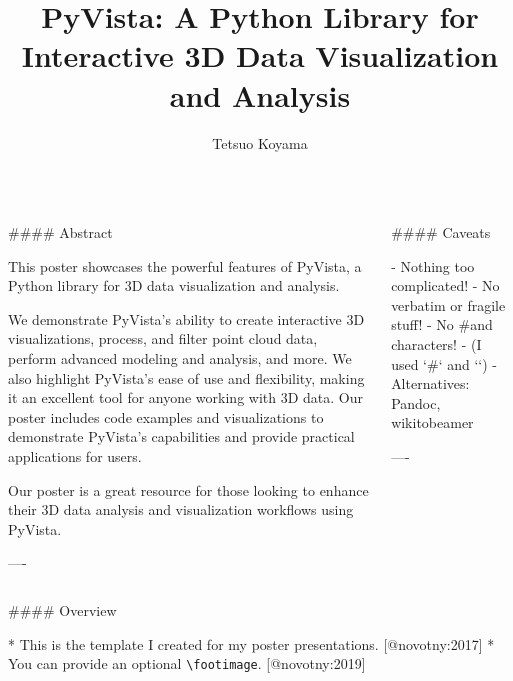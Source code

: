 \documentclass{beamer}
\author[tkoyama@gmail.com]{Tetsuo Koyama}
\title{PyVista: A Python Library for Interactive 3D Data Visualization and Analysis}
\institute{PyVista community}
\newcommand{\texthash}{\#}
\begin{document}
\begin{frame}[fragile]\centering

\begin{columns}
\begin{column}{0.57\textwidth}

\begin{markdown}

#### Abstract

This poster showcases the powerful features of PyVista, a Python library for 3D data visualization and analysis.

We demonstrate PyVista's ability to create interactive 3D visualizations, process, and filter point cloud data, perform advanced modeling and analysis, and more.
We also highlight PyVista's ease of use and flexibility, making it an excellent tool for anyone working with 3D data.
Our poster includes code examples and visualizations to demonstrate PyVista's capabilities and provide practical applications for users.

Our poster is a great resource for those looking to enhance their 3D data analysis and visualization workflows using PyVista.

----
\end{markdown}
\end{column}

\begin{column}{.4\textwidth}
\begin{markdown}

#### Caveats

- Nothing too complicated! 
- No verbatim or fragile stuff!
- No \texthash and \textunderscore{} characters!
- (I used `\texthash` and `\textunderscore`)
- Alternatives: Pandoc, wikitobeamer

----
\end{markdown}
\end{column}

\end{columns}

\bigskip
{\hrulefill}
\bigskip

\begin{columns}[T]

\begin{column}{.46\textwidth}

\begin{markdown}

#### Overview

* This is the template I created for my poster presentations. [@novotny:2017]
* You can provide an optional \texttt{\textbackslash footimage}. [@novotny:2019]


\end{markdown}
\end{column}
\end{columns}
\end{frame}
\end{document}
